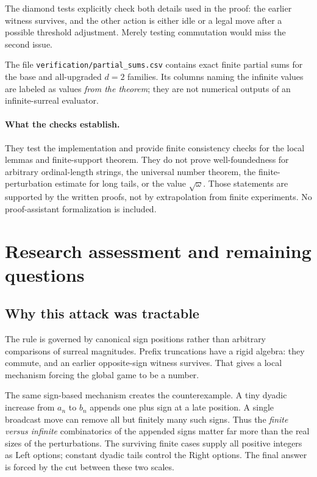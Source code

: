 \documentclass[11pt,letterpaper]{article}
\theoremstyle{definition}
\theoremstyle{remark}
\begin{document}
The diamond tests explicitly check both details used in the proof: the earlier
witness survives, and the other action is either idle or a legal move after a
possible threshold adjustment. Merely testing commutation would miss the
second issue.

The file \texttt{verification/partial\_sums.csv} contains exact finite partial
sums for the base and all-upgraded $d=2$ families. Its columns naming the infinite
values are labeled as values \emph{from the theorem}; they are not numerical
outputs of an infinite-surreal evaluator.

\paragraph{What the checks establish.}
They test the implementation and provide finite consistency checks for the local
lemmas and finite-support theorem. They do not prove well-foundedness for
arbitrary ordinal-length strings, the universal number theorem, the
finite-perturbation estimate for long tails, or the value $\sqrt{\omega}$.
Those statements are supported by the written proofs, not by extrapolation from
finite experiments. No proof-assistant formalization is included.

\section{Research assessment and remaining questions}\label{sec:assessment}

\subsection{Why this attack was tractable}

The rule is governed by canonical sign positions rather than arbitrary
comparisons of surreal magnitudes. Prefix truncations have a rigid algebra:
they commute, and an earlier opposite-sign witness survives. That gives a local
mechanism forcing the global game to be a number.

The same sign-based mechanism creates the counterexample. A tiny dyadic
increase from $a_n$ to $b_n$ appends one plus sign at a late position. A single
broadcast move can remove all but finitely many such signs. Thus the
\emph{finite versus infinite} combinatorics of the appended signs matter far
more than the real sizes of the perturbations. The surviving finite cases
supply all positive integers as Left options; constant dyadic tails control the
Right options. The final answer is forced by the cut between these two scales.
\end{document}
